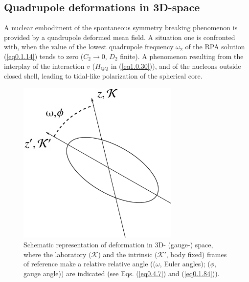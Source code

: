 \subsection{Quadrupole deformations in 3D-space}
A nuclear embodiment of the spontaneous symmetry breaking phenomenon is provided by a quadrupole deformed  mean field. A situation one is confronted with, when the value of the lowest quadrupole frequency $\omega_2$ of the RPA solution (\ref{eq0.1.14}) tends to zero ($C_2\to0$, $D_2$ finite). A phenomenon resulting from the interplay of the interaction $v$ ($H_{QQ}$ in (\ref{eq1.0.30})), and of the nucleons outside closed shell, leading to tidal-like polarization of the spherical core.
\begin{figure}
	\centerline {
		\includegraphics*[width=8cm, angle=0.]{introduccion/figs/fig0_4_4}
	}
	\caption{Schematic representation of deformation in  3D- (gauge-) space, where the laboratory ($\mathcal K$) and the intrinsic ($\mathcal K'$, body fixed) frames of reference make a relative relative angle (($\omega$, Euler angles); ($\phi$, gauge angle)) are  indicated (see Eqs. (\ref{eq0.4.7}) and (\ref{eq0.1.84})).}
	\label{fig0.4.4}
\end{figure}
